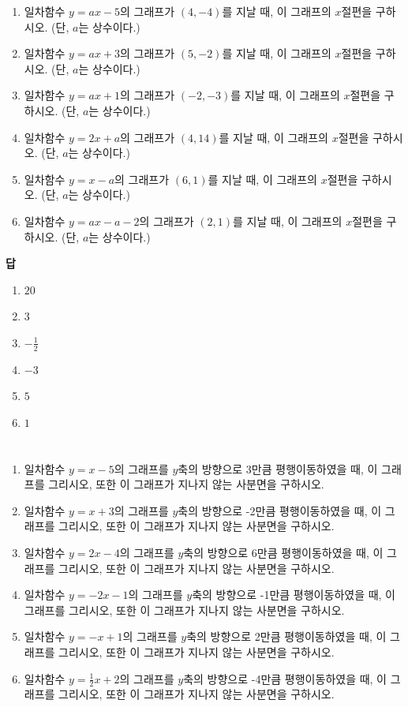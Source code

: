 \documentclass{article}
\begin{document}
\begin{enumerate}[label=(\arabic*), itemsep=80pt]
    \item
    일차함수 $y=ax-5$의 그래프가 $(4,-4)$를 지날 때, 이 그래프의 $x$절편을 구하시오. (단, $a$는 상수이다.)
    \item
    일차함수 $y=ax+3$의 그래프가 $(5,-2)$를 지날 때, 이 그래프의 $x$절편을 구하시오. (단, $a$는 상수이다.)
    \item
    일차함수 $y=ax+1$의 그래프가 $(-2,-3)$를 지날 때, 이 그래프의 $x$절편을 구하시오. (단, $a$는 상수이다.)
    \item
    일차함수 $y=2x+a$의 그래프가 $(4,14)$를 지날 때, 이 그래프의 $x$절편을 구하시오. (단, $a$는 상수이다.)
    \item
    일차함수 $y=x-a$의 그래프가 $(6,1)$를 지날 때, 이 그래프의 $x$절편을 구하시오. (단, $a$는 상수이다.)
    \item
    일차함수 $y=ax-a-2$의 그래프가 $(2,1)$를 지날 때, 이 그래프의 $x$절편을 구하시오. (단, $a$는 상수이다.)

\end{enumerate}
\vspace*{\fill}
\noindent\textbf{답}
\begin{enumerate}[label=(\arabic*)]
    \item \(20\)
    \item \(3\)
    \item \(-\frac12\)
    \item \(-3\)
    \item \(5\)
    \item \(1\)
\end{enumerate}


\newpage
\section{}

\begin{enumerate}[label=(\arabic*), itemsep=60pt]
    \item
    일차함수 $y=x-5$의 그래프를 $y$축의 방향으로 3만큼 평행이동하였을 때, 이 그래프를 그리시오, 또한 이 그래프가 지나지 않는 사분면을 구하시오.
    \item
    일차함수 $y=x+3$의 그래프를 $y$축의 방향으로 -2만큼 평행이동하였을 때, 이 그래프를 그리시오, 또한 이 그래프가 지나지 않는 사분면을 구하시오.
    \item
    일차함수 $y=2x-4$의 그래프를 $y$축의 방향으로 6만큼 평행이동하였을 때, 이 그래프를 그리시오, 또한 이 그래프가 지나지 않는 사분면을 구하시오.
    \item
    일차함수 $y=-2x-1$의 그래프를 $y$축의 방향으로 -1만큼 평행이동하였을 때, 이 그래프를 그리시오, 또한 이 그래프가 지나지 않는 사분면을 구하시오.
    \item
    일차함수 $y=-x+1$의 그래프를 $y$축의 방향으로 2만큼 평행이동하였을 때, 이 그래프를 그리시오, 또한 이 그래프가 지나지 않는 사분면을 구하시오.
    \item
    일차함수 $y=\frac12x+2$의 그래프를 $y$축의 방향으로 -4만큼 평행이동하였을 때, 이 그래프를 그리시오, 또한 이 그래프가 지나지 않는 사분면을 구하시오.
\end{enumerate}
\end{document}
